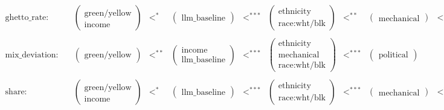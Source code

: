\begin{table}[htbp]
\begin{align*}
\text{ghetto\_rate:} & \quad \begin{pmatrix} \text{green/yellow} \\ \text{income} \end{pmatrix} & <^{*} & \begin{pmatrix} \text{llm\_baseline} \end{pmatrix} & <^{***} & \begin{pmatrix} \text{ethnicity} \\ \text{race:wht/blk} \end{pmatrix} & <^{**} & \begin{pmatrix} \text{mechanical} \end{pmatrix} & <^{***} & \begin{pmatrix} \text{political} \end{pmatrix} \\\\[1em]
\text{mix\_deviation:} & \quad \begin{pmatrix} \text{green/yellow} \end{pmatrix} & <^{**} & \begin{pmatrix} \text{income} \\ \text{llm\_baseline} \end{pmatrix} & <^{***} & \begin{pmatrix} \text{ethnicity} \\ \text{mechanical} \\ \text{race:wht/blk} \end{pmatrix} & <^{***} & \begin{pmatrix} \text{political} \end{pmatrix} \\\\[2em]
\text{share:} & \quad \begin{pmatrix} \text{green/yellow} \\ \text{income} \end{pmatrix} & <^{*} & \begin{pmatrix} \text{llm\_baseline} \end{pmatrix} & <^{***} & \begin{pmatrix} \text{ethnicity} \\ \text{race:wht/blk} \end{pmatrix} & <^{***} & \begin{pmatrix} \text{mechanical} \end{pmatrix} & <^{***} & \begin{pmatrix} \text{political} \end{pmatrix} \\\\[1em]

\end{align*}
\end{table}
